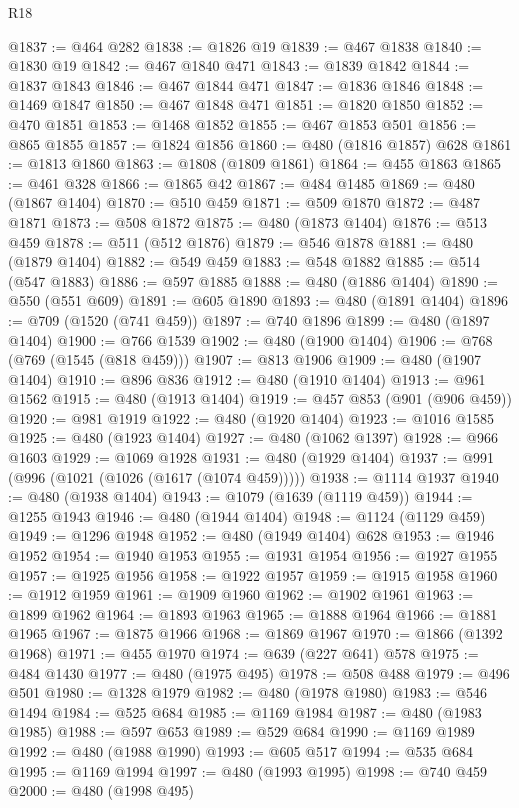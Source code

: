 \begin{lexlean}{R18}
\begin{coremodule}
{{{{{{{{{{{{{{{{{{{{{{{{{{{{{{{{{{{{{{{{{{{{{{{{{{{{{{{{{{{{{{{{{{{{{{{{{{{{{{{{{{{{{{{{{{{{{{{{{{{{{{{{{{{{{@1837 := @464 @282
@1838 := @1826 @19
@1839 := @467 @1838
@1840 := @1830 @19
@1842 := @467 @1840 @471
@1843 := @1839 @1842
@1844 := @1837 @1843
@1846 := @467 @1844 @471
@1847 := @1836 @1846
@1848 := @1469 @1847
@1850 := @467 @1848 @471
@1851 := @1820 @1850
@1852 := @470 @1851
@1853 := @1468 @1852
@1855 := @467 @1853 @501
@1856 := @865 @1855
@1857 := @1824 @1856
@1860 := @480 (@1816 @1857) @628
@1861 := @1813 @1860
@1863 := @1808 (@1809 @1861)
@1864 := @455 @1863
@1865 := @461 @328
@1866 := @1865 @42
@1867 := @484 @1485
@1869 := @480 (@1867 @1404)
@1870 := @510 @459
@1871 := @509 @1870
@1872 := @487 @1871
@1873 := @508 @1872
@1875 := @480 (@1873 @1404)
@1876 := @513 @459
@1878 := @511 (@512 @1876)
@1879 := @546 @1878
@1881 := @480 (@1879 @1404)
@1882 := @549 @459
@1883 := @548 @1882
@1885 := @514 (@547 @1883)
@1886 := @597 @1885
@1888 := @480 (@1886 @1404)
@1890 := @550 (@551 @609)
@1891 := @605 @1890
@1893 := @480 (@1891 @1404)
@1896 := @709 (@1520 (@741 @459))
@1897 := @740 @1896
@1899 := @480 (@1897 @1404)
@1900 := @766 @1539
@1902 := @480 (@1900 @1404)
@1906 := @768 (@769 (@1545 (@818 @459)))
@1907 := @813 @1906
@1909 := @480 (@1907 @1404)
@1910 := @896 @836
@1912 := @480 (@1910 @1404)
@1913 := @961 @1562
@1915 := @480 (@1913 @1404)
@1919 := @457 @853 (@901 (@906 @459))
@1920 := @981 @1919
@1922 := @480 (@1920 @1404)
@1923 := @1016 @1585
@1925 := @480 (@1923 @1404)
@1927 := @480 (@1062 @1397)
@1928 := @966 @1603
@1929 := @1069 @1928
@1931 := @480 (@1929 @1404)
@1937 := @991 (@996 (@1021 (@1026 (@1617 (@1074 @459)))))
@1938 := @1114 @1937
@1940 := @480 (@1938 @1404)
@1943 := @1079 (@1639 (@1119 @459))
@1944 := @1255 @1943
@1946 := @480 (@1944 @1404)
@1948 := @1124 (@1129 @459)
@1949 := @1296 @1948
@1952 := @480 (@1949 @1404) @628
@1953 := @1946 @1952
@1954 := @1940 @1953
@1955 := @1931 @1954
@1956 := @1927 @1955
@1957 := @1925 @1956
@1958 := @1922 @1957
@1959 := @1915 @1958
@1960 := @1912 @1959
@1961 := @1909 @1960
@1962 := @1902 @1961
@1963 := @1899 @1962
@1964 := @1893 @1963
@1965 := @1888 @1964
@1966 := @1881 @1965
@1967 := @1875 @1966
@1968 := @1869 @1967
@1970 := @1866 (@1392 @1968)
@1971 := @455 @1970
@1974 := @639 (@227 @641) @578
@1975 := @484 @1430
@1977 := @480 (@1975 @495)
@1978 := @508 @488
@1979 := @496 @501
@1980 := @1328 @1979
@1982 := @480 (@1978 @1980)
@1983 := @546 @1494
@1984 := @525 @684
@1985 := @1169 @1984
@1987 := @480 (@1983 @1985)
@1988 := @597 @653
@1989 := @529 @684
@1990 := @1169 @1989
@1992 := @480 (@1988 @1990)
@1993 := @605 @517
@1994 := @535 @684
@1995 := @1169 @1994
@1997 := @480 (@1993 @1995)
@1998 := @740 @459
@2000 := @480 (@1998 @495)
}}}}}}}}}}}}}}}}}}}}}}}}}}}}}}}}}}}}}}}}}}}}}}}}}}}}}}}}}}}}}}}}}}}}}}}}}}}}}}}}}}}}}}}}}}}}}}}}}}}}}}}}}}}}}
\end{coremodule}
\end{lexlean}
